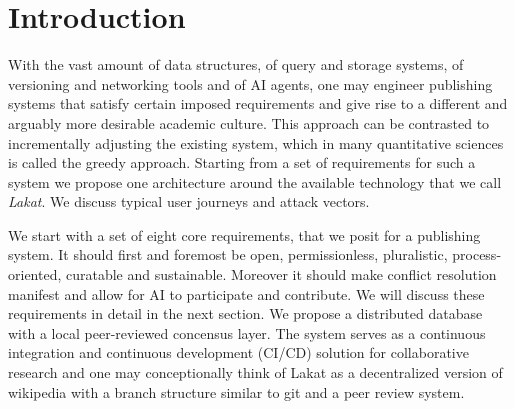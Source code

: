 \documentclass[14pt]{article}
\title{\sc{Lakat}\break \sc{A Publishing Architecture}}
\author{Leonhard Horstmeyer \\
\remark{Do not distribute}}
\date{\today}
\begin{document}
\maketitle

\tableofcontents

\begin{abstract}
    
\end{abstract}


\section{Introduction}

With the vast amount of data structures, of query and storage systems, of versioning and networking tools and of AI agents, one may engineer publishing systems that satisfy certain imposed requirements and give rise to a different and arguably more desirable academic culture. This approach can be contrasted  to incrementally adjusting the existing system, which in many quantitative sciences is called the greedy approach. Starting from a set of requirements for such a system we propose one architecture around the available technology that we call \textit{Lakat}.
We discuss typical user journeys and attack vectors.

We start with a set of eight core requirements, that we posit for a publishing system. It should first and foremost be open, permissionless, pluralistic, process-oriented, curatable and sustainable. Moreover it should make conflict resolution manifest and allow for AI to participate and contribute. We will discuss these requirements in detail in the next section. We propose a distributed database with a local peer-reviewed concensus layer. The system serves as a continuous integration and continuous development (CI/CD) solution for collaborative research and one may conceptionally think of Lakat as a decentralized version of wikipedia with a branch structure similar to git and a peer review system.
\end{document}
